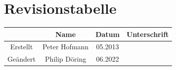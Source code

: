 \documentclass[a5paper,oneside,openany,headings=small]{scrbook}
\begin{document}
\newpage
\thispagestyle{empty}
\section*{Revisionstabelle}

\begin{table}[H]
	\centering
	\begin{tabular}{c|c|c|c}
		& \textbf{Name} & \textbf{Datum} & \textbf{Unterschrift}\\
		\hline
		Erstellt & Peter Hofmann & 05.2013 & \\
		\hline
		Geändert & Philip Döring & 06.2022 & 
	\end{tabular}
\end{table}

\newpage
\mbox{}\thispagestyle{empty}

\newpage
{}
\setlength\parindent{0pt}
\tableofcontents
\newpage
\thispagestyle{empty}





%


%
%


\appendix
\end{document}
